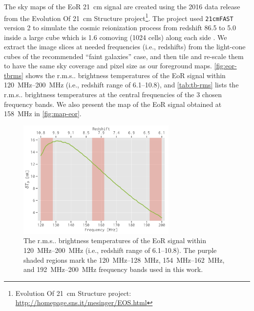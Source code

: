 \documentclass[modern]{aastex62}
\makeatletter
\newcommand{\rms}{r.m.s\@ifnextchar.{}{.\@}}
\makeatother
\begin{document}
The sky maps of the EoR 21~cm signal are created using the 2016
data release from the Evolution Of 21~cm Structure project\footnote{%
  Evolution Of 21~cm Structure project:
  \url{http://homepage.sns.it/mesinger/EOS.html}}.
The project used \texttt{21cmFAST} version 2 \citep{mesinger2011} to
simulate the cosmic reionization process from redshift 86.5 to 5.0 inside
a large cube which is 1.6 comoving \si{\Gpc} (1024 cells) along each side
\citep{mesinger2016}.
We extract the image slices at needed frequencies (i.e., redshifts) from
the light-cone cubes of the recommended \enquote{faint galaxies} case,
and then tile and re-scale them to have the same sky coverage and
pixel size as our foreground maps.
{\color{cyan}%
\autoref{fig:eor-tbrms} shows the \rms{} brightness temperatures of the
EoR signal within \SIrange{120}{200}{\MHz} (i.e., redshift range of
\numrange{6.1}{10.8}),
and \autoref{tab:tb-rms} lists the \rms{} brightness temperatures at the
central frequencies of the 3 chosen frequency bands.
We also present the map of the EoR signal obtained at \SI{158}{\MHz} in
\autoref{fig:map-eor}.}

\begin{figure}
  \centering
  \includegraphics[width=0.7\textwidth]{eos2016-tbrms}
  \caption{\label{fig:eor-tbrms}%
    The \rms{} brightness temperatures of the EoR signal within
    \SIrange{120}{200}{\MHz} (i.e., redshift range of
    \numrange{6.1}{10.8}).
    The purple shaded regions mark the \SIrange{120}{128}{\MHz},
    \SIrange{154}{162}{\MHz}, and \SIrange{192}{200}{\MHz}
    frequency bands used in this work.
  }
\end{figure}
\end{document}
